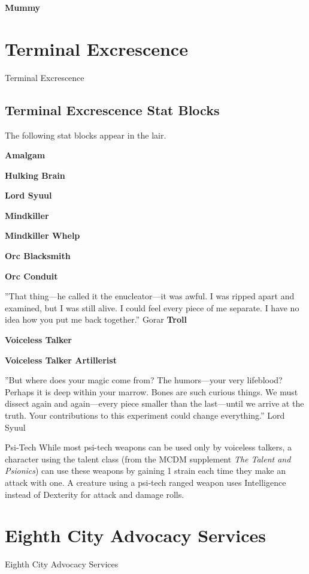 \documentclass[10pt,a4paper,twoside,bg=print,twocolumn,openany,nodeprecatedcode]{dndbook}
\begin{document}
\textbf{Mummy}

\chapter{Terminal Excrescence}
Terminal Excrescence

\section{Terminal Excrescence Stat Blocks}
The following stat blocks appear in the lair.

\textbf{Amalgam}

\textbf{Hulking Brain}

\textbf{Lord Syuul}

\textbf{Mindkiller}

\textbf{Mindkiller Whelp}

\textbf{Orc Blacksmith}

\textbf{Orc Conduit}

\DndQuote%
{}
{''That thing—he called it the enucleator—it was awful. I was ripped apart and examined, but I was still alive. I could feel every piece of me separate. I have no idea how you put me back together.''}
{Gorar}
\textbf{Troll}

\textbf{Voiceless Talker}

\textbf{Voiceless Talker Artillerist}

\DndQuote%
{}
{''But where does your magic come from? The humors—your very lifeblood? Perhaps it is deep within your marrow. Bones are such curious things. We must dissect again and again—every piece smaller than the last—until we arrive at the truth. Your contributions to this experiment could change everything.''}
{Lord Syuul}
\begin{DndSidebar}[float=!b]{Psi-Tech}
While most psi-tech weapons can be used only by voiceless talkers, a character using the talent class (from the MCDM supplement \textit{The Talent and Psionics}) can use these weapons by gaining 1 strain each time they make an attack with one. A creature using a psi-tech ranged weapon uses Intelligence instead of Dexterity for attack and damage rolls.



\end{DndSidebar}

\chapter{Eighth City Advocacy Services}
Eighth City Advocacy Services
\end{document}
